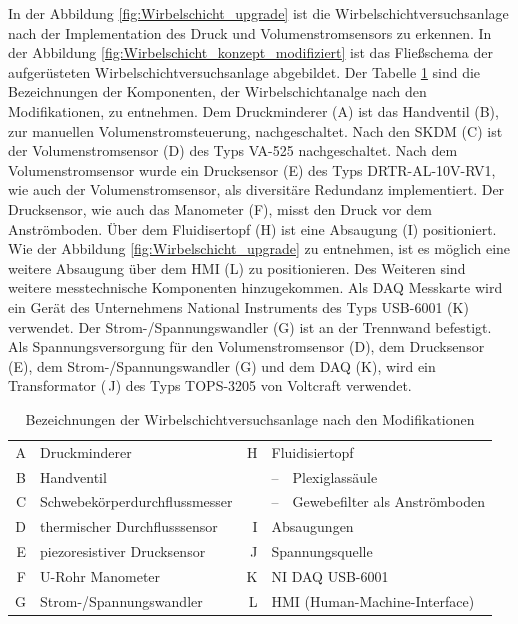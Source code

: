 In der Abbildung \ref{fig:Wirbelschicht_upgrade} ist die Wirbelschichtversuchsanlage nach der Implementation des Druck und Volumenstromsensors zu erkennen. In der Abbildung \ref{fig:Wirbelschicht_konzept_modifiziert} ist das Fließschema der aufgerüsteten Wirbelschichtversuchsanlage abgebildet. Der Tabelle \ref{tab:bezeichnungstabelle_nach_den Modifikationen} sind die Bezeichnungen der Komponenten, der Wirbelschichtanalge nach den Modifikationen, zu entnehmen. Dem Druckminderer ({\Hypatia A}) ist das Handventil ({\Hypatia B}), zur manuellen Volumenstromsteuerung, nachgeschaltet. Nach den SKDM ({\Hypatia C}) ist der Volumenstromsensor ({\Hypatia D}) des Typs VA-525 nachgeschaltet. Nach dem Volumenstromsensor wurde ein Drucksensor ({\Hypatia E}) des Typs DRTR-AL-10V-RV1, wie auch der Volumenstromsensor, als diversitäre Redundanz implementiert. Der Drucksensor, wie auch das Manometer ({\Hypatia F}), misst den Druck vor dem Anströmboden. Über dem Fluidisertopf ({\Hypatia H}) ist eine Absaugung ({\Hypatia I}) positioniert. Wie der Abbildung  \ref{fig:Wirbelschicht_upgrade} zu entnehmen, ist es möglich eine weitere Absaugung  über dem HMI ({\Hypatia L}) zu positionieren. Des Weiteren sind weitere messtechnische Komponenten hinzugekommen. Als DAQ Messkarte wird ein Gerät des Unternehmens National Instruments des Typs USB-6001 ({\Hypatia K}) verwendet. Der Strom-/Spannungswandler ({\Hypatia G}) ist an der Trennwand befestigt. Als Spannungsversorgung für den Volumenstromsensor ({\Hypatia D}), dem Drucksensor ({\Hypatia E}), dem Strom-/Spannungswandler ({\Hypatia G}) und dem DAQ ({\Hypatia K}), wird ein Transformator ({\Hypatia \,J}) des Typs TOPS-3205 von Voltcraft verwendet.\\



\begin{table}[h!]
\caption{Bezeichnungen der Wirbelschichtversuchsanlage nach den Modifikationen} \label{tab:bezeichnungstabelle_nach_den Modifikationen}
\begin{center}
{\Hypatia \begin{tabular}{rl r l}
A & Druckminderer 						& H & Fluidisiertopf  \\[0.1em]
B & Handventil 	 							& &  --~\, Plexiglassäule\\[0.1em]
C & Schwebekörperdurchflussmesser \quad \quad 		& & -- ~\,Gewebefilter als Anströmboden  \\[0.1em]
D & thermischer Durchflusssensor 	&  I & Absaugungen \\[0.1em]
E & piezoresistiver Drucksensor	 	& J & Spannungsquelle \\[0.1em]
F & U-Rohr Manometer 					&	K & NI DAQ USB-6001 \\[0.1em]
G & Strom-/Spannungswandler	 	&  L  & HMI (Human-Machine-Interface)\\[0.1em]				
\end{tabular}}
\end{center}
\end{table}


